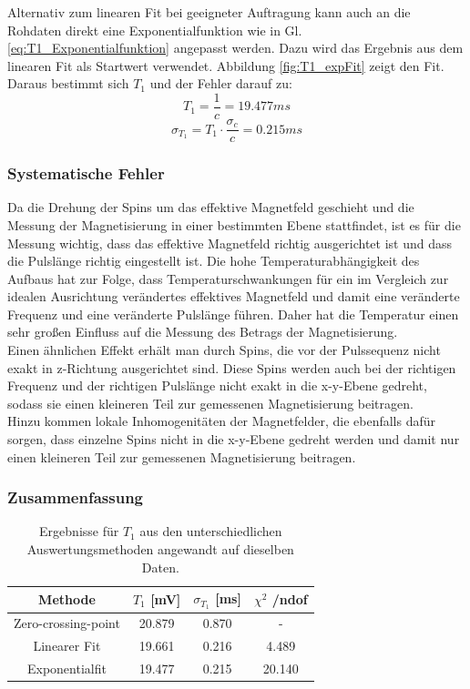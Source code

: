 \documentclass[12pt,a4paper]{article}
\begin{document}
Alternativ zum linearen Fit bei geeigneter Auftragung kann auch an die Rohdaten direkt eine Exponentialfunktion  wie in Gl. \ref{eq:T1_Exponentialfunktion} angepasst werden. Dazu wird das Ergebnis aus dem linearen Fit als Startwert verwendet. Abbildung \ref{fig:T1_expFit} zeigt den Fit. Daraus bestimmt sich $T_1$ und der Fehler darauf zu:
\begin{equation*}
T_1 = \dfrac{1}{c} = 19.477 ms
\end{equation*}
\begin{equation*}
\sigma _{T_1} = T_1 \cdot \dfrac{\sigma _c}{c} = 0.215 ms
\end{equation*}

\subsubsection{Systematische Fehler} 
Da die Drehung der Spins um das effektive Magnetfeld geschieht und die Messung der Magnetisierung in einer bestimmten Ebene stattfindet, ist es für die Messung wichtig, dass das effektive Magnetfeld richtig ausgerichtet ist und dass die Pulslänge richtig eingestellt ist. Die hohe Temperaturabhängigkeit des Aufbaus hat zur Folge, dass Temperaturschwankungen für ein im Vergleich zur idealen Ausrichtung verändertes effektives Magnetfeld und damit eine veränderte Frequenz und eine veränderte Pulslänge führen. Daher hat die Temperatur einen sehr großen Einfluss auf die Messung des Betrags der Magnetisierung. \\
Einen ähnlichen Effekt erhält man durch Spins, die vor der Pulssequenz nicht exakt in z-Richtung ausgerichtet sind. Diese Spins werden auch bei der richtigen Frequenz und der richtigen Pulslänge nicht exakt in die x-y-Ebene gedreht, sodass sie einen kleineren Teil zur gemessenen Magnetisierung beitragen. \\
Hinzu kommen lokale Inhomogenitäten der Magnetfelder, die ebenfalls dafür sorgen, dass einzelne Spins nicht in die x-y-Ebene gedreht werden und damit nur einen kleineren Teil zur gemessenen Magnetisierung beitragen.

\subsubsection{Zusammenfassung}

\begin{table}
\centering
\begin{tabular}{|c|c|c|c|}
\hline 
Methode & $T_1$ [mV] & $\sigma _{T_1}$ [ms] & $\chi ^2$ /ndof \\ 
\hline 
Zero-crossing-point & 20.879 & 0.870 & - \\ 
\hline 
Linearer Fit & 19.661 & 0.216 & 4.489 \\ 
\hline 
Exponentialfit & 19.477 & 0.215 & 20.140 \\ 
\hline 
\end{tabular} 
\caption{Ergebnisse für $T_1$ aus den unterschiedlichen Auswertungsmethoden angewandt auf dieselben Daten.}
\label{tab:T1_Ergebnisse}
\end{table}
\end{document}
